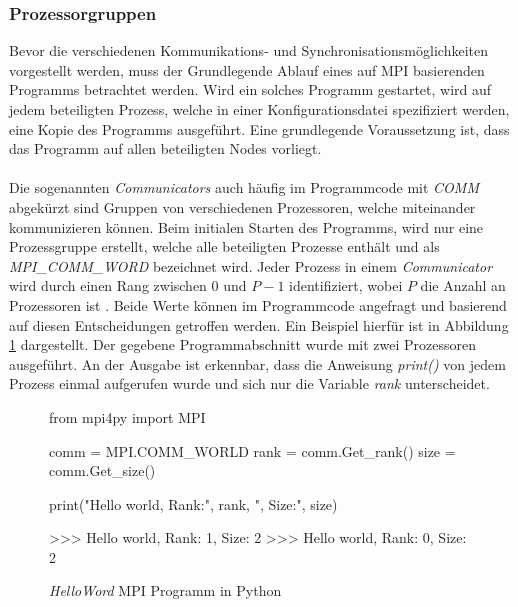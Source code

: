 \subsubsection{Prozessorgruppen}
Bevor die verschiedenen Kommunikations- und Synchronisationsmöglichkeiten vorgestellt werden, muss der Grundlegende Ablauf eines auf \ac{MPI} basierenden Programms betrachtet werden. Wird ein solches Programm gestartet, wird auf jedem beteiligten Prozess, welche in einer Konfigurationsdatei spezifiziert werden, eine Kopie des Programms ausgeführt. Eine grundlegende Voraussetzung ist, dass das Programm auf allen beteiligten Nodes vorliegt. 
\\\\
Die sogenannten \emph{Communicators} auch häufig im Programmcode mit \emph{COMM} abgekürzt sind Gruppen von verschiedenen Prozessoren, welche miteinander kommunizieren können. Beim initialen Starten des Programms, wird nur eine Prozessgruppe erstellt, welche alle beteiligten Prozesse enthält und als \emph{MPI\_COMM\_WORD} bezeichnet wird. Jeder Prozess in einem \emph{Communicator} wird  durch einen Rang zwischen $0$ und $P-1$ identifiziert, wobei $P$ die Anzahl an Prozessoren ist \cite{nielsen2016introduction}. Beide Werte können im Programmcode angefragt und basierend auf diesen Entscheidungen getroffen werden. Ein Beispiel hierfür ist in Abbildung \ref{fig:example_process_group} dargestellt. Der gegebene Programmabschnitt wurde mit zwei Prozessoren ausgeführt. An der Ausgabe ist erkennbar, dass die Anweisung \emph{print()} von jedem Prozess einmal aufgerufen wurde und sich nur die Variable \emph{rank} unterscheidet. 
\begin{figure}
	
	\begin{python}
		from mpi4py import MPI
		
		comm = MPI.COMM_WORLD
		rank = comm.Get_rank()
		size = comm.Get_size()
		
		print("Hello world, Rank:", rank, ", Size:", size)
		
		>>> Hello world, Rank: 1, Size: 2
		>>> Hello world, Rank: 0, Size: 2
	\end{python}
	\caption{\emph{HelloWord} \ac{MPI} Programm in Python}
	\label{fig:example_process_group}
\end{figure}



